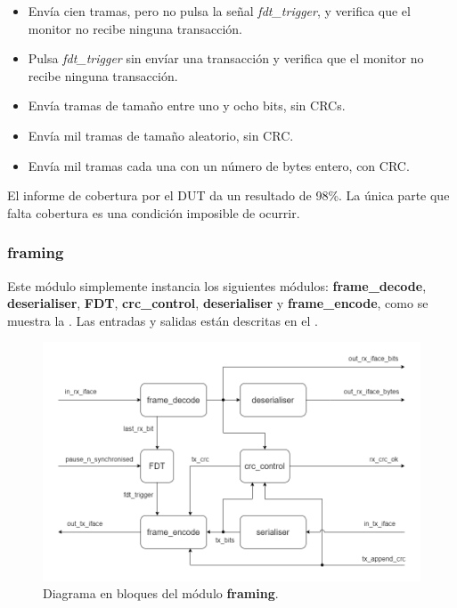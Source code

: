 \documentclass[a4paper, twoside, 11pt]{report}
\begin{document}
\begin{itemize}
  \item Envía cien tramas, pero no pulsa la señal \textit{fdt\_trigger}, y verifica que el monitor no recibe ninguna transacción.
  \item Pulsa \textit{fdt\_trigger} sin envíar una transacción y verifica que el monitor no recibe ninguna transacción.
  \item Envía tramas de tamaño entre uno y ocho bits, sin CRCs.
  \item Envía mil tramas de tamaño aleatorio, sin CRC.
  \item Envía mil tramas cada una con un número de bytes entero, con CRC.
\end{itemize}

El informe de cobertura por el DUT da un resultado de 98\%. La única parte que falta cobertura es una condición imposible de ocurrir.

\FloatBarrier
\subsubsection{framing}

Este módulo simplemente instancia los siguientes módulos: \textbf{frame\_decode}, \textbf{deserialiser}, \textbf{FDT}, \textbf{crc\_control}, \textbf{deserialiser} y \textbf{frame\_encode}, como se muestra la . Las entradas y salidas están descritas en el .

\begin{figure}[htb]
  \centering
  \includegraphics[width=1.0\textwidth]{./img/framing.drawio}
  \caption{Diagrama en bloques del módulo \textbf{framing}.}
  \label{fig:framing}
\end{figure}
\end{document}
